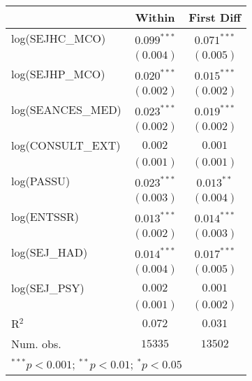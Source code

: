 \begin{tabular}{l c c}
    \toprule
                      & Within        & First Diff    \\
    \midrule
    log(SEJHC\_MCO)   & $0.099^{***}$ & $0.071^{***}$ \\
                      & $(0.004)$     & $(0.005)$     \\
    log(SEJHP\_MCO)   & $0.020^{***}$ & $0.015^{***}$ \\
                      & $(0.002)$     & $(0.002)$     \\
    log(SEANCES\_MED) & $0.023^{***}$ & $0.019^{***}$ \\
                      & $(0.002)$     & $(0.002)$     \\
    log(CONSULT\_EXT) & $0.002$       & $0.001$       \\
                      & $(0.001)$     & $(0.001)$     \\
    log(PASSU)        & $0.023^{***}$ & $0.013^{**}$  \\
                      & $(0.003)$     & $(0.004)$     \\
    log(ENTSSR)       & $0.013^{***}$ & $0.014^{***}$ \\
                      & $(0.002)$     & $(0.003)$     \\
    log(SEJ\_HAD)     & $0.014^{***}$ & $0.017^{***}$ \\
                      & $(0.004)$     & $(0.005)$     \\
    log(SEJ\_PSY)     & $0.002$       & $0.001$       \\
                      & $(0.001)$     & $(0.002)$     \\
    \midrule
    R$^2$             & $0.072$       & $0.031$       \\
    Num. obs.         & $15335$       & $13502$       \\
    \bottomrule
    \multicolumn{3}{l}{\scriptsize{$^{***}p<0.001$; $^{**}p<0.01$; $^{*}p<0.05$}}
\end{tabular}
